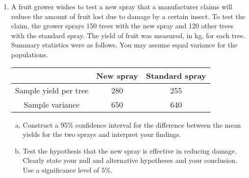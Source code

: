 \documentclass[a4paper,12pt]{article}
\begin{document}
\begin{enumerate}
\newpage


\item A fruit grower wishes to test a new spray that a manufacturer claims will
reduce the amount of fruit lost due to damage by a certain insect. To test
the claim, the grower sprays 150 trees with the new spray and 120 other
trees with the standard spray. The yield of fruit was measured, in kg, for
each tree. Summary statistics were as follows. You may assume equal variance for the populations.

\begin{center}
\begin{tabular}{|c|c|c|} \hline 
                       & New spray & Standard spray\\ \hline 
Sample yield per tree  & 280       & 255\\ \hline 
Sample variance        & 650      & 640\\ \hline 
\end{tabular}
\end{center}
\begin{enumerate}[(a)]
\item Construct a 95\% confidence interval for the difference between the mean yields for the two sprays and interpret your findings. 
\item Test the hypothesis that the new spray is effective in reducing damage. Clearly state your null and alternative hypotheses and your conclusion. Use a significance level of 5\%.
\end{enumerate}

\end{enumerate}
\end{document}
